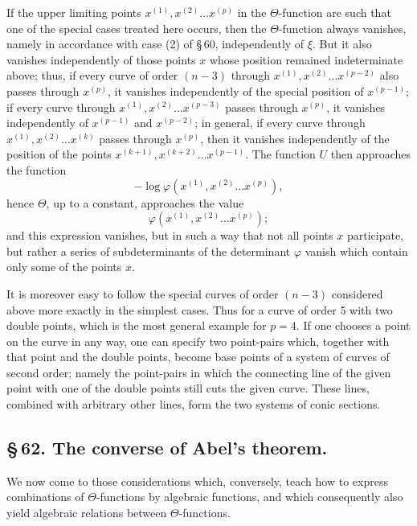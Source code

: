 \documentclass[10pt]{article}
\begin{document}
If the upper limiting points \(x^{(1)},x^{(2)}\ldots x^{(p)}\) in the \(\Theta\)-function are such that one of the special cases treated here occurs, then the \(\Theta\)-function always vanishes, namely in accordance with case (2) of \S\,60, independently of \(\xi\). But it also vanishes independently of those points \(x\) whose position remained indeterminate above; thus, if every curve of order \((n-3)\) through \(x^{(1)},x^{(2)}\ldots x^{(p-2)}\) also passes through \(x^{(p)}\), it vanishes independently of the special position of \(x^{(p-1)}\); if every curve through \(x^{(1)},x^{(2)}\ldots x^{(p-3)}\) passes through \(x^{(p)}\), it vanishes independently of \(x^{(p-1)}\) and \(x^{(p-2)}\); in general, if every curve through \(x^{(1)},x^{(2)}\ldots x^{(k)}\) passes through \(x^{(p)}\), then it vanishes independently of the position of the points \(x^{(k+1)},x^{(k+2)}\ldots x^{(p-1)}\). The function \(U\) then approaches the function
\[
-\log\varphi(x^{(1)},x^{(2)}\ldots x^{(p)}),
\]
hence \(\Theta\), up to a constant, approaches the value
\[
\varphi(x^{(1)},x^{(2)}\ldots x^{(p)});
\]
and this expression vanishes, but in such a way that not all points \(x\) participate, but rather a series of subdeterminants of the determinant \(\varphi\) vanish which contain only some of the points \(x\).

It is moreover easy to follow the special curves of order \((n-3)\) considered above more exactly in the simplest cases. Thus for a curve of order 5 with two double points, which is the most general example for \(p=4\). If one chooses a point on the curve in any way, one can specify two point-pairs which, together with that point and the double points, become base points of a system of curves of second order; namely the point-pairs in which the connecting line of the given point with one of the double points still cuts the given curve. These lines, combined with arbitrary other lines, form the two systems of conic sections.

\subsection*{\S\,62. The converse of Abel's theorem.}

We now come to those considerations which, conversely, teach how to express combinations of \(\Theta\)-functions by algebraic functions, and which consequently also yield algebraic relations between \(\Theta\)-functions.
\end{document}
